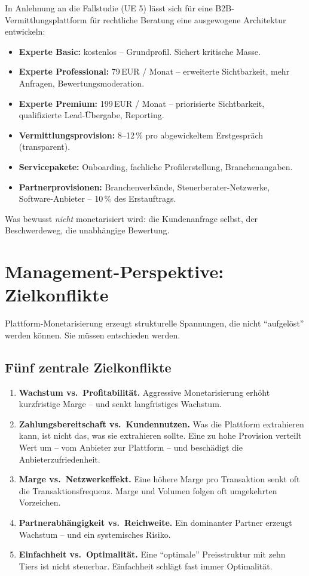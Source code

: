 \documentclass[11pt,a4paper,oneside]{article}
\begin{document}
In Anlehnung an die Fallstudie (UE 5) lässt sich für eine B2B-Vermittlungsplattform für rechtliche Beratung eine ausgewogene Architektur entwickeln:

\begin{itemize}
  \item \textbf{Experte Basic:} kostenlos -- Grundprofil. Sichert kritische Masse.
  \item \textbf{Experte Professional:} 79\,EUR / Monat -- erweiterte Sichtbarkeit, mehr Anfragen, Bewertungsmoderation.
  \item \textbf{Experte Premium:} 199\,EUR / Monat -- priorisierte Sichtbarkeit, qualifizierte Lead-Übergabe, Reporting.
  \item \textbf{Vermittlungsprovision:} 8--12\,\% pro abgewickeltem Erstgespräch (transparent).
  \item \textbf{Servicepakete:} Onboarding, fachliche Profilerstellung, Branchenangaben.
  \item \textbf{Partnerprovisionen:} Branchenverbände, Steuerberater-Netzwerke, Software-Anbieter -- 10\,\% des Erstauftrags.
\end{itemize}

Was bewusst \emph{nicht} monetarisiert wird: die Kundenanfrage selbst, der Beschwerdeweg, die unabhängige Bewertung.

\section{Management-Perspektive: Zielkonflikte}

Plattform-Monetarisierung erzeugt strukturelle Spannungen, die nicht ``aufgelöst'' werden können. Sie müssen entschieden werden.

\subsection{Fünf zentrale Zielkonflikte}

\begin{enumerate}
  \item \textbf{Wachstum vs.\ Profitabilität.} Aggressive Monetarisierung erhöht kurzfristige Marge -- und senkt langfristiges Wachstum.
  \item \textbf{Zahlungsbereitschaft vs.\ Kundennutzen.} Was die Plattform extrahieren kann, ist nicht das, was sie extrahieren sollte. Eine zu hohe Provision verteilt Wert um -- vom Anbieter zur Plattform -- und beschädigt die Anbieterzufriedenheit.
  \item \textbf{Marge vs.\ Netzwerkeffekt.} Eine höhere Marge pro Transaktion senkt oft die Transaktionsfrequenz. Marge und Volumen folgen oft umgekehrten Vorzeichen.
  \item \textbf{Partnerabhängigkeit vs.\ Reichweite.} Ein dominanter Partner erzeugt Wachstum -- und ein systemisches Risiko.
  \item \textbf{Einfachheit vs.\ Optimalität.} Eine ``optimale'' Preisstruktur mit zehn Tiers ist nicht steuerbar. Einfachheit schlägt fast immer Optimalität.
\end{enumerate}
\end{document}
